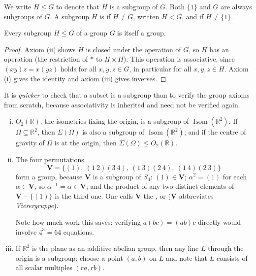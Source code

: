 \begin{notation}
	We write \(H \leq G\) to denote that \(H\) is a subgroup of \(G\). Both \(\{1\}\) and
	\(G\) are always subgroups of \(G\). A subgroup \(H\) is  if \(H \neq G\),
	written \(H < G\), and  if \(H \neq \{1\}\).
\end{notation}

\begin{proposition}\label{prop:subgroup-is-group}
	Every subgroup \(H \leq G\) of a group \(G\) is itself a group.
\end{proposition}

\begin{proof}
	Axiom (ii) shows \(H\) is closed under the operation of \(G\), so \(H\) has an operation
	(the restriction of \(*\) to \(H\times H\)). This operation is associative, since
	\((xy)z = x(yz)\) holds for all \(x,y,z \in G\), in particular for all
	\(x,y,z \in H\). Axiom (i) gives the identity and axiom (iii) gives inverses.
\end{proof}

\begin{intuition}
	It is \emph{quicker} to check that a subset is a subgroup than to verify the group axioms
	from scratch, because associativity is inherited and need not be verified again.
\end{intuition}

\begin{eg}[Subgroups]\label{eg:subgroups}
	\begin{enumerate}[(i)]
		\item \(O_2(\mathbb{R})\), the isometries fixing the origin, is a subgroup of
		      \(\operatorname{Isom}(\mathbb{R}^2)\). If \(\Omega \subseteq \mathbb{R}^2\),
		      then \(\Sigma(\Omega)\) is also a subgroup of
		      \(\operatorname{Isom}(\mathbb{R}^2)\); and if the centre of gravity of
		      \(\Omega\) is at the origin, then \(\Sigma(\Omega) \leq O_2(\mathbb{R})\).
		\item The four permutations
		      \[
			      \mathbf{V} = \bigl\{(1),\ (1\ 2)(3\ 4),\ (1\ 3)(2\ 4),\ (1\ 4)(2\ 3)\bigr\}
		      \]
		      form a group, because \(\mathbf{V}\) is a subgroup of \(S_4\): \((1) \in
			      \mathbf{V}\); \(\alpha^2 = (1)\) for each \(\alpha \in \mathbf{V}\), so
		      \(\alpha^{-1} = \alpha \in \mathbf{V}\); and the product of any two distinct
		      elements of \(\mathbf{V} - \{(1)\}\) is the third one. One calls
		      \(\mathbf{V}\) the , or 
		      (\(\mathbf{V}\) abbreviates \emph{Vierergruppe}).

		      Note how much work this saves: verifying \(a(bc) = (ab)c\) directly would
		      involve \(4^3 = 64\) equations.
		\item If \(\mathbb{R}^2\) is the plane as an additive abelian group, then any line
		      \(L\) through the origin is a subgroup: choose a point \((a,b)\) on \(L\) and
		      note that \(L\) consists of all scalar multiples \((ra, rb)\).
	\end{enumerate}
\end{eg}

